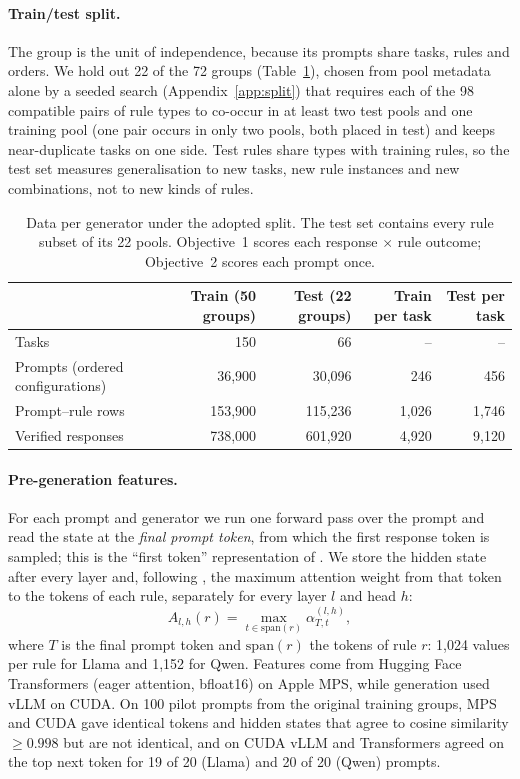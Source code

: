 \documentclass{article}
\begin{document}
\paragraph{Train/test split.} The group is the unit of independence, because its prompts share tasks, rules and
orders. We hold out 22 of the 72 groups (Table~\ref{tab:counts}), chosen from pool metadata alone by a seeded search
(Appendix~\ref{app:split}) that requires each of the 98 compatible pairs of rule types to co-occur in at least two test
pools and one training pool (one pair occurs in only two pools, both placed in test) and keeps near-duplicate tasks
on one side. Test rules share types with training rules, so the test set measures generalisation to new tasks, new
rule instances and new combinations, not to new kinds of rules.

\begin{table}[t]
\centering\small
\caption{Data per generator under the adopted split. The test set contains every rule subset of its 22 pools.
Objective~1 scores each response $\times$ rule outcome; Objective~2 scores each prompt once.}
\label{tab:counts}
\setlength{\tabcolsep}{6pt}
\begin{tabular}{lrrrr}
\toprule
 & Train (50 groups) & Test (22 groups) & Train per task & Test per task \\
\midrule
Tasks & 150 & 66 & -- & -- \\
Prompts (ordered configurations) & 36,900 & 30,096 & 246 & 456 \\
Prompt--rule rows & 153,900 & 115,236 & 1,026 & 1,746 \\
Verified responses & 738,000 & 601,920 & 4,920 & 9,120 \\
\bottomrule
\end{tabular}
\end{table}

\paragraph{Pre-generation features.} For each prompt and generator we run one forward pass over the prompt and read the
state at the \emph{final prompt token}, from which the first response token is sampled; this is the ``first token''
representation of \citet{heo2025know}. We store the hidden state after every layer and, following
\citet{yuksekgonul2024attention}, the maximum attention weight from that token to the tokens of each rule, separately
for every layer $l$ and head $h$:
\begin{equation}
A_{l,h}(r)=\max_{t\in\mathrm{span}(r)}\alpha^{(l,h)}_{T,t},
\label{eq:maxattn}
\end{equation}
where $T$ is the final prompt token and $\mathrm{span}(r)$ the tokens of rule $r$: 1,024 values per rule for Llama and
1,152 for Qwen. Features come from Hugging Face Transformers (eager attention, bfloat16) on Apple MPS, while
generation used vLLM on CUDA. On 100 pilot prompts from the original training groups, MPS and CUDA gave identical tokens and
hidden states that agree to cosine similarity $\ge0.998$ but are not identical, and on CUDA vLLM and Transformers
agreed on the top next token for 19 of 20 (Llama) and 20 of 20 (Qwen) prompts.
\end{document}
